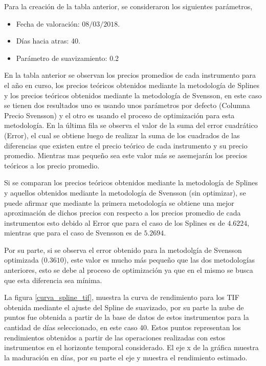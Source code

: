 \hspace{0.4cm} Para la creaci\'on de la tabla anterior, se consideraron los siguientes par\'ametros,

\begin{itemize}
  \item Fecha de valoraci\'on: $08/03/2018$.
  \item D\'ias hacia atras: 40.
  \item Par\'ametro de suavizamiento: 0.2
\end{itemize}


\hspace{0.4cm} En la tabla anterior se observan los precios promedios de cada instrumento para el a\~no en curso, los precios te\'oricos obtenidos mediante la metodolog\'ia de Splines y los precios te\'oricos obtenidos mediante la metodolog\'ia de Svensson, en este caso se tienen dos resultados uno es usando unos par\'ametros por defecto (Columna Precio Svensson) y el otro es usando el proceso de optimizaci\'on para esta metodolog\'ia. En la \'ultima fila se observa el valor de la suma del error cuadr\'atico (Error), el cual se obtiene luego de realizar la suma de los cuadrados de las diferencias que existen entre el precio te\'orico de cada instrumento y su precio promedio. Mientras mas peque\~no sea este valor m\'as se asemejar\'an los precios te\'oricos a los precio promedio.

\hspace{0.4cm} Si se comparan los precios te\'oricos obtenidos mediante la metodolog\'ia de Splines y aquellos obtenidos mediante la metodolog\'ia de Svensson (sin optimizar), se puede afirmar que mediante la primera metodolog\'ia se obtiene una mejor aproximaci\'on de dichos precios con respecto a los precios promedio de cada instrumentos esto debido al Error que para el caso de los Splines es de $4.6224$, mientras que para el caso de Svensson es de $5.2694$.

\hspace{0.4cm} Por su parte, si se observa el error obtenido para la metodolg\'ia de Svensson optimizada ($0.3610$), este valor es mucho m\'as peque\~no que las dos metodolog\'ias anteriores, esto se debe al proceso de optimizaci\'on ya que en el mismo se busca que esta diferencia sea m\'inima.

\hspace{0.4cm} La figura \ref{curva_spline_tif}, muestra la curva de rendimiento para los TIF obtenida mediante el ajuste del Spline de suavizado, por su parte la nube de puntos fue obtenida a partir de la base de datos de estos instrumentos para la cantidad de d\'ias seleccionado, en este caso 40. Estos puntos representan los rendimientos obtenidos a partir de las operaciones realizadas con estos instrumentos en el horizonte temporal considerado. El eje x de la gr\'afica muestra la maduraci\'on en d\'ias, por su parte el eje y muestra el rendimiento estimado.

